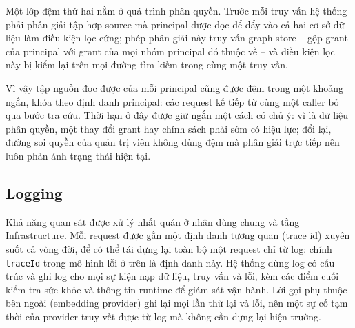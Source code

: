 Một lớp đệm thứ hai nằm ở quá trình phân quyền. Trước mỗi truy vấn hệ thống phải phân giải tập hợp source mà principal được đọc để đẩy vào cả hai cơ sở dữ liệu làm điều kiện lọc cứng; phép phân giải này truy vấn graph store -- gộp grant của principal với grant của mọi nhóm principal đó thuộc về -- và điều kiện lọc này bị kiểm lại trên mọi đường tìm kiếm trong cùng một truy vấn. 

Vì vậy tập nguồn đọc được của mỗi principal cũng được đệm trong một khoảng ngắn, khóa theo định danh principal: các request kế tiếp từ cùng một caller bỏ qua bước tra cứu. Thời hạn ở đây được giữ ngắn một cách có chủ ý: vì là dữ liệu phân quyền, một thay đổi grant hay chính sách phải sớm có hiệu lực; đổi lại, đường soi quyền của quản trị viên không dùng đệm mà phân giải trực tiếp nên luôn phản ánh trạng thái hiện tại.

\subsection{Logging}

Khả năng quan sát được xử lý nhất quán ở nhân dùng chung và tầng Infrastructure. Mỗi request được gắn một định danh tương quan (trace id) xuyên suốt cả vòng đời, để có thể tái dựng lại toàn bộ một request chỉ từ log: chính \texttt{traceId} trong mô hình lỗi ở trên là định danh này. Hệ thống dùng log có cấu trúc và ghi log cho mọi sự kiện nạp dữ liệu, truy vấn và lỗi, kèm các điểm cuối kiểm tra sức khỏe và thông tin runtime để giám sát vận hành. Lời gọi phụ thuộc bên ngoài (embedding provider) ghi lại mọi lần thử lại và lỗi, nên một sự cố tạm thời của provider truy vết được từ log mà không cần dựng lại hiện trường.
